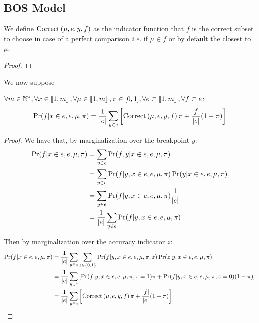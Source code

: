 \subsection{BOS Model}

\begin{definition}
    We define $\text{Correct}\left(\mu, e, y, f\right)$ as the indicator function that $f$ is the correct subset to choose in case of a perfect comparison \textit{i.e.} if $\mu \in f$ or by default the closest to $\mu$.
\end{definition}
\begin{proof}
    
    
\end{proof}


We now suppose 
\begin{lemma}[$e_j$ transition]
    $\forall m \in \mathbb{N}^*, \forall x \in \left\llbracket1, m\right\rrbracket, \forall \mu \in \left\llbracket1, m\right\rrbracket, \pi \in [0, 1], \forall e \subset \left\llbracket1, m\right\rrbracket, \forall f \subset e$:
    \[ \Pr(f | x \in e, e, \mu, \pi) =  \frac{1}{\left|e\right|} \sum_{y \in e} \left[ \text{Correct}\left(\mu, e, y, f\right) \pi + \frac{\left|f\right|}{\left|e\right|} (1 - \pi) \right] \]
\end{lemma}
\begin{proof}
    We have that, by marginalization over the breakpoint $y$:
    \begin{align}
        \Pr(f | x \in e, e, \mu, \pi) 
        &= \sum_{y \in e} \Pr(f, y | x \in e, e, \mu, \pi) \\
        &= \sum_{y \in e} \Pr(f | y, x \in e, e, \mu, \pi) \Pr(y | x \in e, e, \mu, \pi) \\
        &= \sum_{y \in e} \Pr(f | y, x \in e, e, \mu, \pi) \frac{1}{\left|e\right|} \\
        &= \frac{1}{\left|e\right|} \sum_{y \in e} \Pr(f | y, x \in e, e, \mu, \pi)
    \end{align}

    Then by marginalization over the accuracy indicator $z$:
    \begin{align}
        \Pr(f | x \in e, e, \mu, \pi) 
        &= \frac{1}{\left|e\right|} \sum_{y \in e} \sum_{z \in \left\{ 0, 1 \right\}} \Pr(f | y, x \in e, e, \mu, \pi, z) \Pr(z | y, x \in e, e, \mu, \pi) \\
        &= \frac{1}{\left|e\right|} \sum_{y \in e} \left[ \Pr(f | y, x \in e, e, \mu, \pi, z=1) \pi + \Pr(f | y, x \in e, e, \mu, \pi, z=0) (1 - \pi) \right] \\
        &= \frac{1}{\left|e\right|} \sum_{y \in e} \left[ \text{Correct}\left(\mu, e, y, f\right) \pi + \frac{\left|f\right|}{\left|e\right|} (1 - \pi) \right]
    \end{align}

\end{proof}



